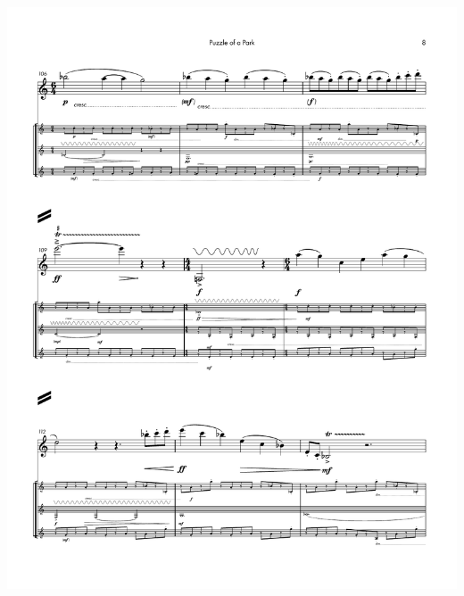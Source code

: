     \begin{center}
    \includegraphics[scale=0.75]{Scores/puzzlePart13.pdf}
    \end{center}
    \newpage
